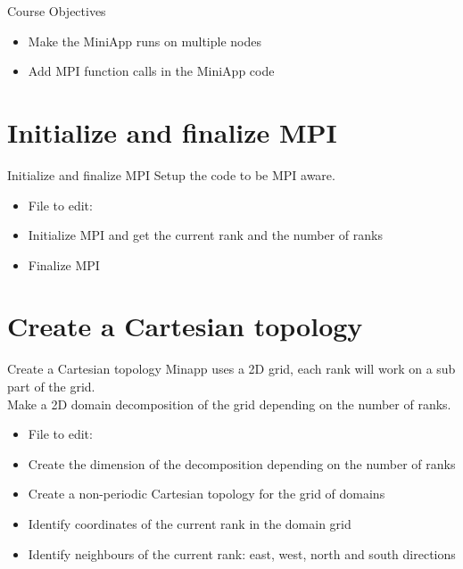 \documentclass[aspectratio=43]{beamer}
\begin{document}
\cscstitle

\begin{frame}{Course Objectives}
\begin{itemize}
\item Make the MiniApp runs on multiple nodes
\item Add MPI function calls in the MiniApp code
\end{itemize}
\end{frame}



\section{Initialize and finalize MPI}
\begin{frame}[fragile]{Initialize and finalize MPI}
Setup the code to be MPI aware.
\begin{itemize}
\item File to edit: 
\item Initialize MPI and get the current rank and the number of ranks
\item Finalize MPI
\end{itemize}
\end{frame}

\section{Create a Cartesian topology}
\begin{frame}[fragile]{Create a Cartesian topology}
Minapp uses a 2D grid, each rank will work on a sub part of the grid.\\
Make a 2D domain decomposition of the grid depending on the number of ranks.\\
\begin{itemize}
\item File to edit: 
\item Create the dimension of the decomposition depending on the number of ranks
\item Create a non-periodic Cartesian topology for the grid of domains
\item Identify coordinates of the current rank in the domain grid
\item Identify neighbours of the current rank: east, west, north and south directions
\end{itemize}
\end{frame}
\end{document}

